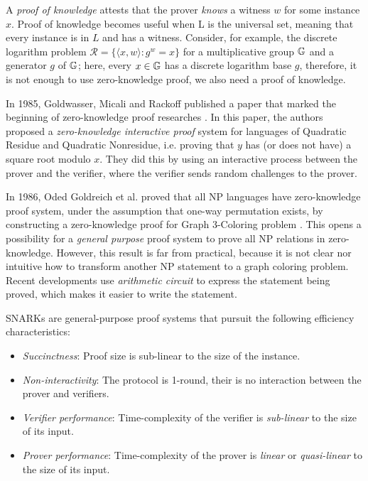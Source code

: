 A \textit{proof of knowledge} attests that the prover \textit{knows} a witness $w$ for some instance $x$. Proof of knowledge becomes useful when L is the universal set, meaning that every instance is in $L$ and has a witness. Consider, for example, the discrete logarithm problem $\mathcal{R} = \{ \langle x, w \rangle : g^w = x\}$ for a multiplicative group $\mathbb{G}$ and a generator $g$ of $\mathbb{G}$; here, every $x \in \mathbb{G}$ has a discrete logarithm base $g$, therefore, it is not enough to use zero-knowledge proof, we also need a proof of knowledge.

In 1985, Goldwasser, Micali and Rackoff published a paper that marked the beginning of zero-knowledge proof researches \cite{goldwasser1985knowledge}. In this paper, the authors proposed a \textit{zero-knowledge interactive proof} system for languages of Quadratic Residue and Quadratic Nonresidue, i.e. proving that $y$ has (or does not have) a square root modulo $x$. They did this by using an interactive process between the prover and the verifier, where the verifier sends random challenges to the prover.

In 1986, Oded Goldreich et al. proved that all NP languages have zero-knowledge proof system, under the assumption that one-way permutation exists, by constructing a zero-knowledge proof for Graph 3-Coloring problem \cite{goldreich1986prove}. This opens a possibility for a \textit{general purpose} proof system to prove all NP relations in zero-knowledge. However, this result is far from practical, because it is not clear nor intuitive how to transform another NP statement to a graph coloring problem. Recent developments use \textit{arithmetic circuit} to express the statement being proved, which makes it easier to write the statement.

SNARKs are general-purpose proof systems that pursuit the following efficiency characteristics:
\begin{itemize}
    \item \textit{Succinctness}: Proof size is sub-linear to the size of the instance.
    \item \textit{Non-interactivity}: The protocol is 1-round, their is no interaction between the prover and verifiers.
    \item \textit{Verifier performance}: Time-complexity of the verifier is \textit{sub-linear} to the size of its input.
    \item \textit{Prover performance}: Time-complexity of the prover is \textit{linear} or \textit{quasi-linear} to the size of its input.
\end{itemize}

